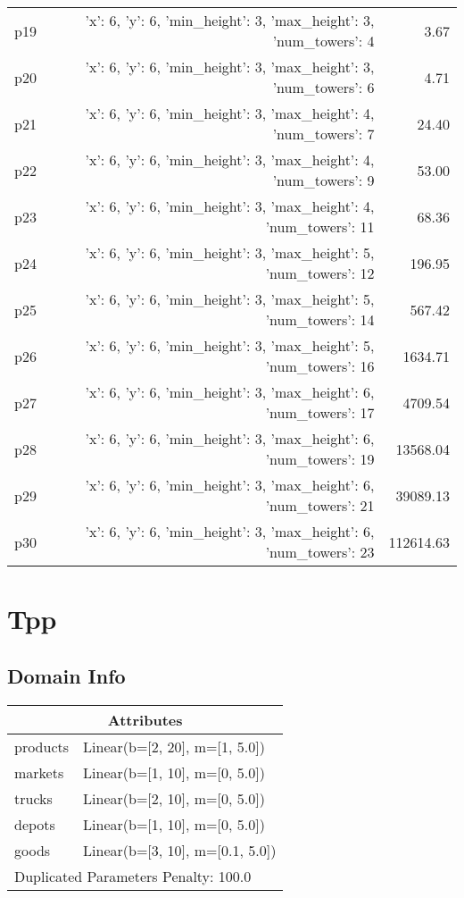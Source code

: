 \documentclass{article}
\begin{document}
\begin{center}
\begin{tabular}{@{}l|r|r@{}}
  p19&{'x': 6, 'y': 6, 'min\_height': 3, 'max\_height': 3, 'num\_towers': 4}&3.67\\
  p20&{'x': 6, 'y': 6, 'min\_height': 3, 'max\_height': 3, 'num\_towers': 6}&4.71\\
  p21&{'x': 6, 'y': 6, 'min\_height': 3, 'max\_height': 4, 'num\_towers': 7}&24.40\\
  p22&{'x': 6, 'y': 6, 'min\_height': 3, 'max\_height': 4, 'num\_towers': 9}&53.00\\
  p23&{'x': 6, 'y': 6, 'min\_height': 3, 'max\_height': 4, 'num\_towers': 11}&68.36\\
  p24&{'x': 6, 'y': 6, 'min\_height': 3, 'max\_height': 5, 'num\_towers': 12}&196.95\\
  p25&{'x': 6, 'y': 6, 'min\_height': 3, 'max\_height': 5, 'num\_towers': 14}&567.42\\
  p26&{'x': 6, 'y': 6, 'min\_height': 3, 'max\_height': 5, 'num\_towers': 16}&1634.71\\
  p27&{'x': 6, 'y': 6, 'min\_height': 3, 'max\_height': 6, 'num\_towers': 17}&4709.54\\
  p28&{'x': 6, 'y': 6, 'min\_height': 3, 'max\_height': 6, 'num\_towers': 19}&13568.04\\
  p29&{'x': 6, 'y': 6, 'min\_height': 3, 'max\_height': 6, 'num\_towers': 21}&39089.13\\
  p30&{'x': 6, 'y': 6, 'min\_height': 3, 'max\_height': 6, 'num\_towers': 23}&112614.63
                            \end{tabular}
                            \end{center}
                    
                            \newpage \section{Tpp}
                    \subsection*{Domain Info}

                    \begin{center}
                    \begin{tabular}{@{}p{}p{}@{}}
                    \multicolumn{2}{c}{\bf \large Attributes}\\\midrule
                    products & Linear(b=[2, 20], m=[1, 5.0])\\
markets & Linear(b=[1, 10], m=[0, 5.0])\\
trucks & Linear(b=[2, 10], m=[0, 5.0])\\
depots & Linear(b=[1, 10], m=[0, 5.0])\\
goods & Linear(b=[3, 10], m=[0.1, 5.0])
                    
                     \\\midrule
                    \multicolumn{2}{l}{Duplicated Parameters Penalty: 100.0}
                    \end{tabular}
                    \end{center}
                
\end{document}
